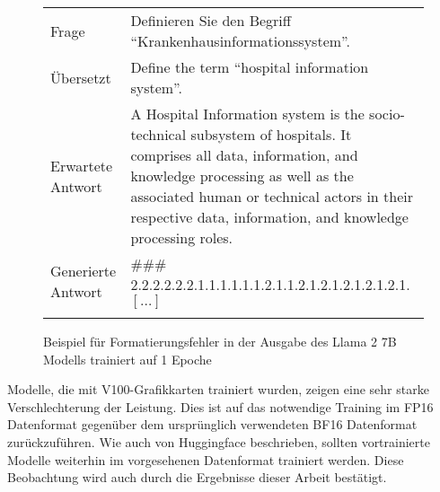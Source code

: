 \begin{figure}
    \begin{tabularx}{\textwidth}{lX}
        \toprule
        Frage              & Definieren Sie den Begriff \enquote{Krankenhausinformationssystem}.                                                                                                                                                                                                    \\
        Übersetzt          & Define the term ``hospital information system''.                                                                                                                                                                                                                       \\
        Erwartete Antwort  & A Hospital Information system is the socio-technical subsystem of hospitals. It comprises all data, information, and knowledge processing as well as the associated human or technical actors in their respective data, information, and knowledge processing roles. \\
        Generierte Antwort & \#\#\# 2.2.2.2.2.2.1.1.1.1.1.1.2.1.1.2.1.2.1.2.1.2.1.2.1. $[\dots]$                                                                                                                                                                                                    \\
        \bottomrule                                                                                                                                                                                                                                                                                 \\
    \end{tabularx}
    \caption{Beispiel für Formatierungsfehler in der Ausgabe des Llama 2 7B Modells trainiert auf 1 Epoche}\label{fig:formatting-errors}
\end{figure}

Modelle, die mit V100-Grafikkarten trainiert wurden, zeigen eine sehr starke Verschlechterung der Leistung.
Dies ist auf das notwendige Training im FP16 Datenformat gegenüber dem ursprünglich verwendeten BF16 Datenformat zurückzuführen.
Wie auch von Huggingface beschrieben, sollten vortrainierte Modelle weiterhin im vorgesehenen Datenformat trainiert werden.
Diese Beobachtung wird auch durch die Ergebnisse dieser Arbeit bestätigt.\\


